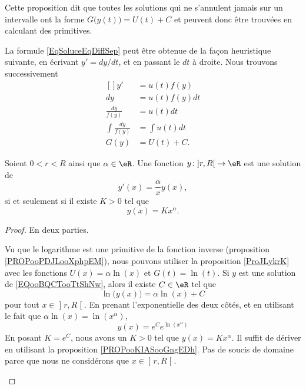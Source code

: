Cette proposition dit que toutes les solutions qui ne s'annulent jamais sur un intervalle ont la forme \( G\big( y(t) \big)=U(t)+C\) et peuvent donc être trouvées en calculant des primitives.

La formule \eqref{EqSoluceEqDiffSep} peut être obtenue de la façon heuristique suivante, en écrivant \( y'=dy/dt\), et en passant le \( dt\) à droite. Nous trouvons successivement
\begin{equation}
	\begin{aligned}[]
		y'                      & =u(t)f(y)    \\
		dy                      & =u(t)f(y)dt  \\
		\frac{ dy }{ f(y) }     & =u(t)dt      \\
		\int\frac{ dy }{ f(y) } & =\int u(t)dt \\
		G(y)                    & =U(t)+C.
	\end{aligned}
\end{equation}


\begin{proposition}     \label{PROPooIGWTooULXrKI}
	Soient \( 0<r<R\) ainsi que \( \alpha\in \eR\). Une fonction \( y\colon \mathopen] r , R \mathclose[\to \eR\) est une solution de
	\begin{equation}        \label{EQooBQCTooTtShNw}
		y'(x)=\frac{ \alpha }{ x }y(x),
	\end{equation}
	si et seulement si il existe \( K >0\) tel que
	\begin{equation}
		y(x)=Kx^{\alpha}.
	\end{equation}
\end{proposition}

\begin{proof}
	En deux parties.
	\begin{subproof}
		\spitem[\( \Rightarrow\)]
		Vu que le logarithme est une primitive de la fonction inverse (proposition \ref{PROPooPDJLooXphpEM}), nous pouvons utiliser la proposition \ref{ProJLykrK} avec les fonctions \( U(x)=\alpha\ln(x)\) et \( G(t)=\ln(t)\). Si \( y\) est une solution de \eqref{EQooBQCTooTtShNw}, alors il existe \( C\in \eR\) tel que
		\begin{equation}
			\ln\big( y(x) \big)=\alpha\ln(x)+C
		\end{equation}
		pour tout \( x\in\mathopen] r , R \mathclose[\). En prenant l'exponentielle des deux côtés, et en utilisant le fait que \( \alpha\ln(x)=\ln(x^{\alpha})\),
		\begin{equation}
			y(x)= e^{C} e^{\ln(x^{\alpha})}
		\end{equation}
		En posant \( K=e^C\), nous avons un \( K>0\) tel que \( y(x)=Kx^{\alpha}\).
		\spitem[\( \Leftarrow\)]
		Il suffit de dériver en utilisant la proposition \ref{PROPooKIASooGngEDh}. Pas de soucis de domaine parce que nous ne considérons que \( x\in \mathopen] r , R \mathclose[\).
	\end{subproof}
\end{proof}

